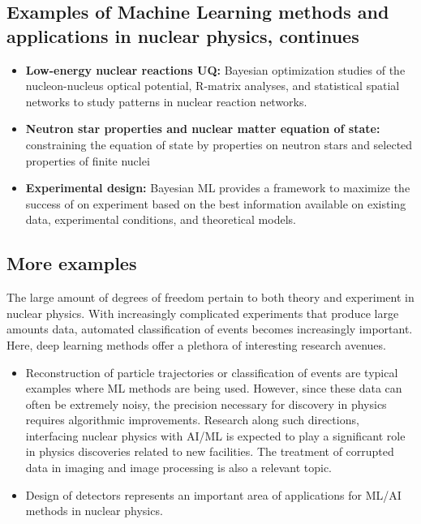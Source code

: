 \documentclass[%
oneside,                 %
final,                   %
10pt]{article}
\begin{document}
\subsection{Examples of Machine Learning methods and applications in nuclear physics, continues}

\begin{block}{}
\begin{itemize}
\item \textbf{Low-energy nuclear reactions UQ:} Bayesian optimization studies of the nucleon-nucleus optical potential, R-matrix analyses,  and  statistical spatial networks to study patterns in nuclear reaction networks.

\item \textbf{Neutron star properties and nuclear matter equation of state:} constraining the equation of state by properties on neutron stars and selected properties of finite nuclei

\item \textbf{Experimental design:} Bayesian ML provides a framework  to  maximize  the  success  of  on  experiment  based on  the  best  information  available  on existing  data, experimental conditions, and theoretical models.
\end{itemize}

\noindent
\end{block}

\subsection{More examples}

The large amount of degrees of freedom pertain to both theory and experiment in nuclear physics. With increasingly complicated experiments that produce large amounts data, automated classification of events becomes increasingly important. Here, deep learning methods offer a plethora of interesting research avenues. 

\begin{block}{}
\begin{itemize}
\item Reconstruction of particle trajectories or classification of events are typical examples where ML methods are being used. However, since these data can often be extremely noisy, the precision necessary for discovery in physics requires algorithmic improvements. Research along such directions, interfacing nuclear physics with AI/ML is expected to play a significant role in physics discoveries related to new facilities.  The treatment of corrupted data in imaging and image processing is also a relevant topic. 

\item Design of detectors represents an important area of applications for ML/AI methods in nuclear physics.
\end{itemize}

\noindent
\end{block}
\end{document}
